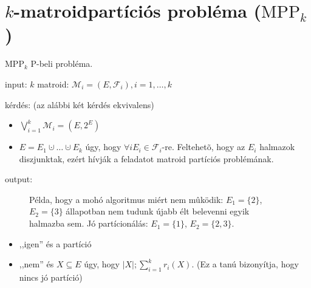 \newpage
\section{$k$-matroidpartíciós probléma ($\mathrm{MPP}_k$)}

\newcommand{\M}{\mathcal{M}}
\newcommand{\F}{\mathcal{F}}
\theoremstyle{definition}
\newtheorem*{definicio}{Definíció} \newtheorem*{tetel}{Tétel}
\newtheorem*{allitas}{Állítás} \newtheorem*{algoritmus}{Algoritmus}
\newtheorem*{pelda}{Példa}

$\mathrm{MPP}_k$ P-beli probléma.

input: $k$ matroid: $\M_i = (E, \F_i), i=1,\ldots,k$

kérdés: (az alábbi két kérdés ekvivalens)

\begin{itemize}
  \item $\bigvee_{i=1}^k \M_i = (E, 2^E)$
  \item $E = E_1 \cupdot \ldots \cupdot E_k$ úgy, hogy $\forall i E_i \in
  \F_i$-re. Feltehetõ, hogy az $E_i$ halmazok diszjunktak, ezért hívják a
  feladatot matroid partíciós problémának.
\end{itemize}

output:

\begin{figure}[hb]
\centering
\caption{Példa, hogy a mohó algoritmus miért nem mûködik: $E_1 = \{2\}$,
$E_2 = \{3\}$ állapotban nem tudunk újabb élt belevenni egyik halmazba sem. 
Jó partícionálás: $E_1 = \{1\}$, $E_2 = \{2, 3\}$.}
\label{fig:M1M2}
\end{figure}

\begin{itemize}
  \item ,,igen'' és a partíció
  \item ,,nem'' és $X \subseteq E$ úgy, hogy $|X|; \sum_{i=1}^k r_i(X)$. (Ez
  a tanú bizonyítja, hogy nincs jó partíció)
\end{itemize}


